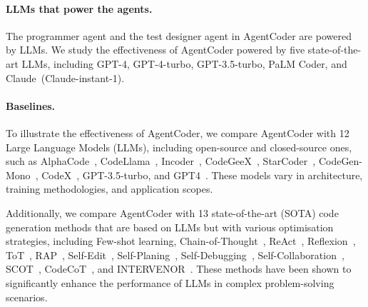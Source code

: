 \documentclass[manuscript,screen,review]{acmart}
\newcommand{\xxx}{AgentCoder\xspace}
\begin{document}
\paragraph{LLMs that power the agents.}  The programmer agent and the test designer agent in \xxx are powered by LLMs. 
We study the effectiveness of \xxx powered by five state-of-the-art LLMs, including GPT-4, GPT-4-turbo, GPT-3.5-turbo, PaLM Coder, and Claude~(Claude-instant-1).

\paragraph{Baselines.} To illustrate the effectiveness of \xxx, we compare \xxx with 12 Large Language Models (LLMs), including open-source and closed-source ones, such as AlphaCode~\cite{Li2022CompetitionlevelCG}, CodeLlama~\cite{roziere2023code}, Incoder~\cite{Fried2022InCoderAG}, CodeGeeX~\cite{Zheng2023CodeGeeXAP}, StarCoder~\cite{Li2023StarCoderMT}, CodeGen-Mono~\cite{nijkamp2022codegen}, CodeX~\cite{Brown2020LanguageMA}, GPT-3.5-turbo, and GPT4~\cite{OpenAI2023GPT4TR}. These models vary in architecture, training methodologies, and application scopes.

Additionally, we compare \xxx with 13 state-of-the-art (SOTA) code generation methods that are based on LLMs but with various optimisation strategies, including Few-shot learning, Chain-of-Thought~\cite{Wei2022ChainOT}, ReAct~\cite{Yao2022ReActSR}, Reflexion~\cite{Shinn2023ReflexionLA}, ToT~\cite{Yao2023TreeOT}, RAP~\cite{Hao2023ReasoningWL}, Self-Edit~\cite{Zhang2023SelfEditFC}, Self-Planing~\cite{Jiang2023SelfplanningCG}, Self-Debugging~\cite{Chen2023TeachingLL}, Self-Collaboration~\cite{Dong2023SelfcollaborationCG}, SCOT~\cite{Li2023StructuredCP}, CodeCoT~\cite{Huang2023CodeCoTAB}, 
and INTERVENOR~\cite{Wang2023INTERVENORPT}. These methods have been shown to significantly enhance the performance of LLMs in complex problem-solving scenarios. 
\end{document}
